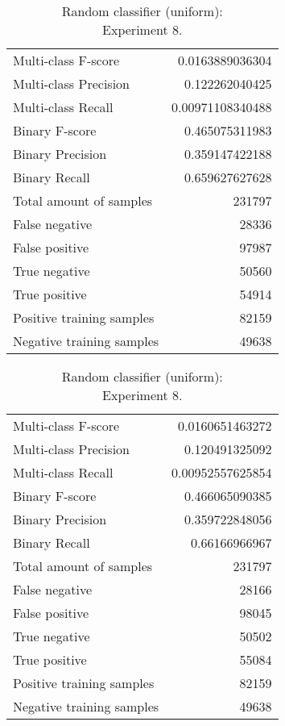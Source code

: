 \begin{table}[H]
\begin{minipage}{0.5\textwidth}
\caption{Random classifier (uniform): \\Experiment 7.}
\centering
\begin{tabular}{l r}
\toprule
Multi-class F-score & 0.0163889036304 \\
Multi-class Precision & 0.122262040425 \\
Multi-class Recall & 0.00971108340488 \\
\midrule
Binary F-score & 0.465075311983 \\
Binary Precision & 0.359147422188 \\
Binary Recall & 0.659627627628 \\
\midrule
Total amount of samples & 231797 \\
False negative & 28336 \\
False positive & 97987 \\
True negative & 50560 \\
True positive & 54914 \\
\midrule
Positive training samples & 82159 \\
Negative training samples & 49638 \\
\bottomrule
\end{tabular}
\end{minipage}
\hfillx
\begin{minipage}{0.5\textwidth}
\caption{Random classifier (uniform): \\Experiment 8.}
\centering
\begin{tabular}{l r}
\toprule
Multi-class F-score & 0.0160651463272 \\
Multi-class Precision & 0.120491325092 \\
Multi-class Recall & 0.00952557625854 \\
\midrule
Binary F-score & 0.466065090385 \\
Binary Precision & 0.359722848056 \\
Binary Recall & 0.66166966967 \\
\midrule
Total amount of samples & 231797 \\
False negative & 28166 \\
False positive & 98045 \\
True negative & 50502 \\
True positive & 55084 \\
\midrule
Positive training samples & 82159 \\
Negative training samples & 49638 \\
\bottomrule
\end{tabular}
\end{minipage}
\end{table}
